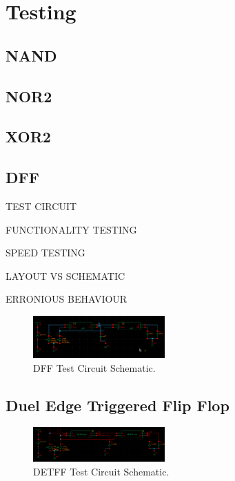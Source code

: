 \chapter{Testing}


\section{NAND}

\section{NOR2}

\section{XOR2}

\section{DFF}

TEST CIRCUIT

FUNCTIONALITY TESTING 

SPEED TESTING

LAYOUT VS SCHEMATIC 

ERRONIOUS BEHAVIOUR


\begin{figure}[h]  
\centering
   \includegraphics[width=0.45\textwidth]{Figures/DFFTestSchem.png}
\caption{DFF Test Circuit Schematic.}
\label {fig:DFFTestSchem}
\end{figure}

\section{Duel Edge Triggered Flip Flop}

\begin{figure}[h]  
\centering
   \includegraphics[width=0.45\textwidth]{Figures/DETFFTestSchem.png}
\caption{DETFF Test Circuit Schematic.}
\label {fig:DETFFTestSchem}
\end{figure}

